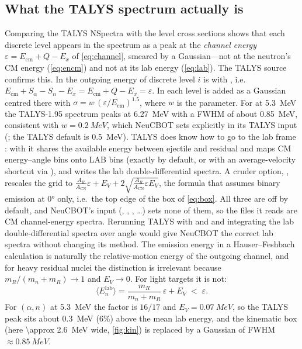 \subsection{What the TALYS spectrum actually is}
Comparing the TALYS NSpectra with the level cross sections shows that each discrete level appears in the spectrum as a peak at the \emph{channel energy} $\varepsilon = E_\text{cm} + Q - E_x$ of \cref{eq:channel}, smeared by a Gaussian---not at the neutron's CM energy (\cref{eq:encm}) and not at its lab energy (\cref{eq:lab}). The TALYS source confirms this. In  the outgoing energy of discrete level $i$ is  with , i.e.\ $E_\text{cm} + S_\alpha - S_n - E_x = E_\text{cm} + Q - E_x = \varepsilon$. In  each level is added as a Gaussian centred there with $\sigma = w\,(\varepsilon/E_\text{cm})^{1.5}$, where $w$ is the  parameter. For  at \SI{5.3}{MeV} the TALYS-1.95 spectrum peaks at \SI{6.27}{MeV} with a FWHM of about \SI{0.85}{MeV}, consistent with $w = \SI{0.2}{MeV}$, which NeuCBOT sets explicitly in its TALYS input (; the TALYS default is \SI{0.5}{MeV}). TALYS does know how to go to the lab frame \cite{talys2}: with  it shares the available energy between ejectile and residual and maps CM energy--angle bins onto LAB bins (exactly by default, or with an average-velocity shortcut via ), and  writes the lab double-differential spectra. A cruder option, , rescales the grid to $\tfrac{A_R}{A_\text{CN}}\varepsilon + E_V + 2\sqrt{\tfrac{A_R}{A_\text{CN}}\varepsilon E_V}$, the formula that assumes binary emission at \ang{0} only, i.e.\ the top edge of the box of \cref{eq:box}. All three are off by default, and NeuCBOT's input (, , , \dots) sets none of them, so the  files it reads are CM channel-energy spectra. Rerunning TALYS with  and  and integrating the lab double-differential spectra over angle would give NeuCBOT the correct lab spectra without changing its method. The emission energy in a Hauser--Feshbach calculation is naturally the relative-motion energy of the outgoing channel, and for heavy residual nuclei the distinction is irrelevant because $m_R/(m_n+m_R)\to1$ and $E_V\to0$. For light targets it is not:
\begin{equation}
\langle E_n^\text{lab}\rangle = \frac{m_R}{m_n + m_R}\,\varepsilon + E_V \;<\; \varepsilon .
\end{equation}
For $(\alpha,n)$ at \SI{5.3}{MeV} the factor is $16/17$ and $E_V = \SI{0.07}{MeV}$, so the TALYS peak sits about \SI{0.3}{MeV} (6\%) above the mean lab energy, and the kinematic box (here \SI{\approx 2.6}{MeV} wide, \cref{fig:kin}) is replaced by a Gaussian of FWHM $\approx\SI{0.85}{MeV}$.

